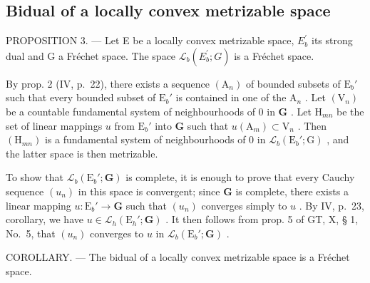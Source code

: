 \subsection{Bidual of a locally convex metrizable space}

PROPOSITION 3. --- Let E be a locally convex metrizable space, \(E_{b}^{\prime}\) its strong dual and G a Fréchet space. The space \(\mathcal{L}_{b}(E_{b}^{\prime}; G)\) is a Fréchet space.

By prop. 2 (IV, p.~22), there exists a sequence \((\mathrm{A}_n)\) of bounded subsets of \(\mathrm{E}_b'\) such that every bounded subset of \(\mathrm{E}_b'\) is contained in one of the \(\mathrm{A}_n\) . Let \((\mathrm{V}_n)\) be a countable fundamental system of neighbourhoods of 0 in \(\mathbf{G}\) . Let \(\mathrm{H}_{mn}\) be the set of linear mappings \(u\) from \(\mathrm{E}_b'\) into \(\mathbf{G}\) such that \(u(\mathrm{A}_m) \subset \mathrm{V}_n\) . Then \((\mathrm{H}_{mn})\) is a fundamental system of neighbourhoods of 0 in \(\mathcal{L}_b(\mathrm{E}_b'; \mathrm{G})\) , and the latter space is then metrizable.

To show that \(\mathcal{L}_b(\mathrm{E}_b';\mathbf{G})\) is complete, it is enough to prove that every Cauchy sequence \((u_n)\) in this space is convergent; since \(\mathbf{G}\) is complete, there exists a linear mapping \(u:\mathrm{E}_b' \to \mathbf{G}\) such that \((u_n)\) converges simply to \(u\) . By IV, p.~23, corollary, we have \(u \in \mathcal{L}_h(\mathrm{E}_h';\mathbf{G})\) . It then follows from prop. 5 of GT, X, § 1, No.~5, that \((u_n)\) converges to \(u\) in \(\mathcal{L}_b(\mathrm{E}_b';\mathbf{G})\) .

COROLLARY. --- The bidual of a locally convex metrizable space is a Fréchet space.

